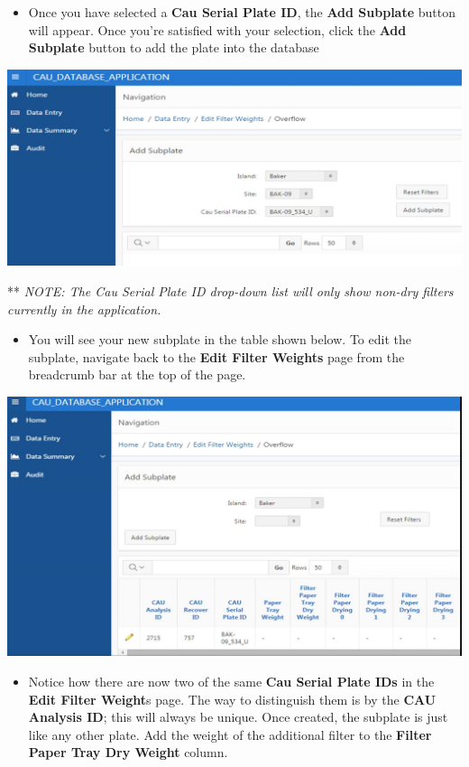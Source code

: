\documentclass[]{book}
\providecommand{\tightlist}{%
  \setlength{\itemsep}{0pt}\setlength{\parskip}{0pt}}
\begin{document}
\begin{itemize}
\tightlist
\item
  Once you have selected a \textbf{Cau Serial Plate ID}, the \textbf{Add Subplate} button will appear. Once you're satisfied with your selection, click the \textbf{Add Subplate} button to add the plate into the database
\end{itemize}

\includegraphics{images/Data19.jpg}

** \emph{NOTE: The Cau Serial Plate ID drop-down list will only show non-dry filters currently in the application.}

\begin{itemize}
\tightlist
\item
  You will see your new subplate in the table shown below. To edit the subplate, navigate back to the \textbf{Edit Filter Weights} page from the breadcrumb bar at the top of the page.
\end{itemize}

\includegraphics{images/Data20.jpg}

\begin{itemize}
\tightlist
\item
  Notice how there are now two of the same \textbf{Cau Serial Plate IDs} in the \textbf{Edit Filter Weight}s page. The way to distinguish them is by the \textbf{CAU Analysis ID}; this will always be unique. Once created, the subplate is just like any other plate. Add the weight of the additional filter to the \textbf{Filter Paper Tray Dry Weight} column.
\end{itemize}
\end{document}
